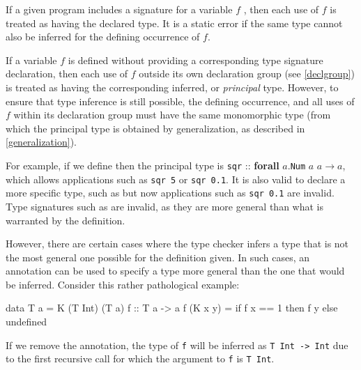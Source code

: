 If a given program includes a signature for a variable $f$ , then each use of $f$ is treated as having the declared type.
It is a static error if the same type cannot also be inferred for the defining occurrence of $f$.

If a variable $f$ is defined without providing a corresponding type signature declaration, then each use of $f$ outside its own declaration group (see \autoref{declgroup}) is treated as having the corresponding inferred, or \emph{principal} type.
However, to ensure that type inference is still possible, the defining occurrence, and all uses of $f$ within its declaration group must have the same monomorphic type (from which the principal type is obtained by generalization, as described in \autoref{generalization}).

For example, if we define 
then the principal type is \texttt{sqr} :: \textbf{forall} $a$.\texttt{Num} $a$ \sym{=>} $a \rightarrow{} a$, which allows applications such as \texttt{sqr 5} or \texttt{sqr 0.1}.
It is also valid to declare a more specific type, such as  but now applications such as \texttt{sqr 0.1} are invalid. Type signatures such as  are invalid, as they are more general than what is warranted by the definition.

However, there are certain cases where the type checker infers a type that is not the most general one possible for the definition given. In such cases, an annotation can be used to specify a type more general than the one that would be inferred. Consider this rather pathological example:
\begin{code}
data T a = K (T Int) (T a)
f :: T a -> a
f (K x y) = if f x == 1 then f y else undefined
\end{code}
If we remove the annotation, the type of \texttt{f} will be inferred as \texttt{T Int -> Int} due to the first recursive call for which the argument to \texttt{f} is \texttt{T Int}.

